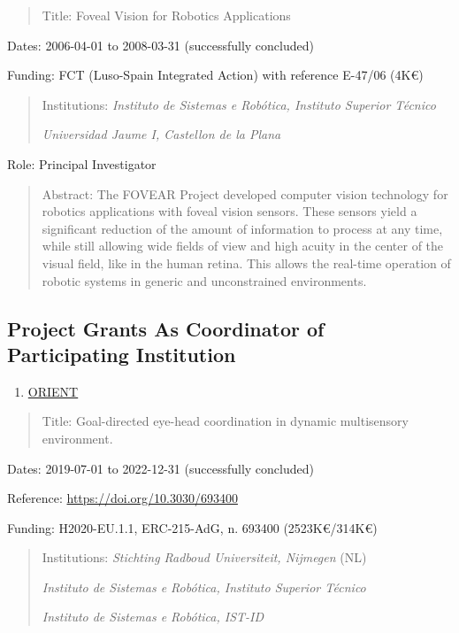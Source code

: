 \begin{quote}
Title: Foveal Vision for Robotics Applications
\end{quote}

Dates: 2006-04-01 to 2008-03-31 (successfully concluded)

Funding: FCT (Luso-Spain Integrated Action) with reference E-47/06 (4K€)

\begin{quote}
Institutions: \emph{Instituto de Sistemas e Robótica, Instituto Superior
Técnico}

\emph{Universidad Jaume I, Castellon de la Plana}
\end{quote}

Role: Principal Investigator

\begin{quote}
Abstract: The FOVEAR Project developed computer vision technology for
robotics applications with foveal vision sensors. These sensors yield a
significant reduction of the amount of information to process at any
time, while still allowing wide fields of view and high acuity in the
center of the visual field, like in the human retina. This allows the
real-time operation of robotic systems in generic and unconstrained
environments.
\end{quote}

\subsection{Project Grants As Coordinator of Participating
Institution}\label{project-grants-as-coordinator-of-participating-institution}

\begin{enumerate}
\def\labelenumi{\arabic{enumi}.}
\item
  \ul{ORIENT}
\end{enumerate}

\begin{quote}
Title: Goal-directed eye-head coordination in dynamic multisensory
environment.
\end{quote}

Dates: 2019-07-01 to 2022-12-31 (successfully concluded)

Reference: \url{https://doi.org/10.3030/693400}

Funding: H2020-EU.1.1, ERC-215-AdG, n. 693400 (2523K€/314K€)

\begin{quote}
Institutions: \emph{Stichting Radboud Universiteit, Nijmegen} (NL)

\emph{Instituto de Sistemas e Robótica, Instituto Superior Técnico}

\emph{Instituto de Sistemas e Robótica, IST-ID}
\end{quote}

